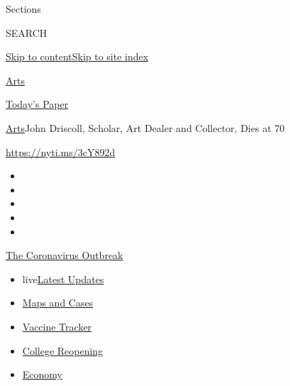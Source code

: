 Sections

SEARCH

\protect\hyperlink{site-content}{Skip to
content}\protect\hyperlink{site-index}{Skip to site index}

\href{https://www.nytimes3xbfgragh.onion/section/arts}{Arts}

\href{https://myaccount.nytimes3xbfgragh.onion/auth/login?response_type=cookie\&client_id=vi}{}

\href{https://www.nytimes3xbfgragh.onion/section/todayspaper}{Today's
Paper}

\href{/section/arts}{Arts}\textbar{}John Driscoll, Scholar, Art Dealer
and Collector, Dies at 70

\url{https://nyti.ms/3cY892d}

\begin{itemize}
\item
\item
\item
\item
\item
\end{itemize}

\href{https://www.nytimes3xbfgragh.onion/news-event/coronavirus?action=click\&pgtype=Article\&state=default\&region=TOP_BANNER\&context=storylines_menu}{The
Coronavirus Outbreak}

\begin{itemize}
\tightlist
\item
  live\href{https://www.nytimes3xbfgragh.onion/2020/08/04/world/coronavirus-covid-19.html?action=click\&pgtype=Article\&state=default\&region=TOP_BANNER\&context=storylines_menu}{Latest
  Updates}
\item
  \href{https://www.nytimes3xbfgragh.onion/interactive/2020/us/coronavirus-us-cases.html?action=click\&pgtype=Article\&state=default\&region=TOP_BANNER\&context=storylines_menu}{Maps
  and Cases}
\item
  \href{https://www.nytimes3xbfgragh.onion/interactive/2020/science/coronavirus-vaccine-tracker.html?action=click\&pgtype=Article\&state=default\&region=TOP_BANNER\&context=storylines_menu}{Vaccine
  Tracker}
\item
  \href{https://www.nytimes3xbfgragh.onion/2020/08/02/us/covid-college-reopening.html?action=click\&pgtype=Article\&state=default\&region=TOP_BANNER\&context=storylines_menu}{College
  Reopening}
\item
  \href{https://www.nytimes3xbfgragh.onion/live/2020/08/03/business/stock-market-today-coronavirus?action=click\&pgtype=Article\&state=default\&region=TOP_BANNER\&context=storylines_menu}{Economy}
\end{itemize}

